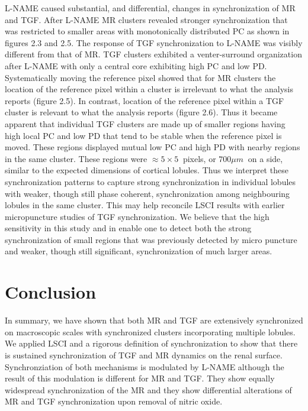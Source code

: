 	L-NAME caused substantial, and differential, changes in synchronization of MR and TGF. After L-NAME MR clusters revealed stronger synchronization that was restricted to smaller areas with monotonically distributed PC as shown in figures 2.3 and 2.5. The response of TGF synchronization to L-NAME was visibly different from that of MR. TGF clusters exhibited a venter-surround organization after L-NAME with only a central core exhibiting high PC and low PD. Systematically moving the reference pixel showed that for MR clusters the location of the reference pixel within a cluster is irrelevant to what the analysis reports (figure 2.5). In contrast, location of the reference pixel within a TGF cluster is relevant to what the analysis reports (figure 2.6). Thus it became apparent that individual TGF clusters are made up of smaller regions having high local PC and low PD that tend to be stable when the reference pixel is moved. These regions displayed mutual low PC and high PD with nearby regions in the same cluster. These regions were $\approx 5 \times 5 \ $ pixels, or $700\mu m \ $ on a side, similar to the expected dimensions of cortical lobules. Thus we interpret these synchronization patterns to capture strong synchronization in individual lobules with weaker, though still phase coherent, synchronization among neighbouring lobules in the same cluster. This may help reconcile LSCI results with earlier micropuncture studies of TGF synchronization. We believe that the high sensitivity in this study and in \cite{HolsteinRathlou11} enable one to detect both the strong synchronization of small regions that was previously detected by micro puncture and weaker, though still significant, synchronization of much larger areas.
	
\section{Conclusion}

	In summary, we have shown that both MR and TGF are extensively synchronized on macroscopic scales with synchronized clusters incorporating multiple lobules. We applied LSCI and a rigorous definition of synchronization to show that there is sustained synchronization of TGF and MR dynamics on the renal surface. Synchronziation of both mechanisms is modulated by L-NAME although the result of this modulation is different for MR and TGF. They show equally widespread synchronization of the MR and they show differential alterations of MR and TGF synchronization upon removal of nitric oxide.


\renewcommand{\bibname}{References}













